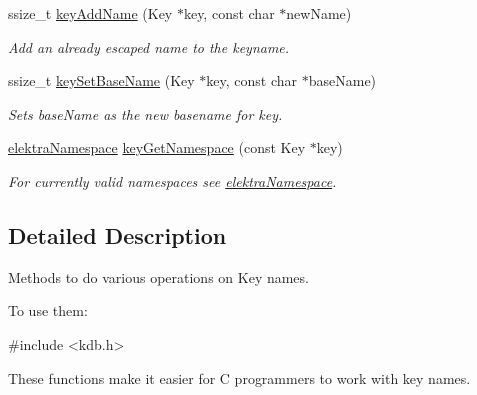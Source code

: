 \begin{DoxyCompactItemize}
ssize\+\_\+t \hyperlink{group__keyname_gaa70593a2c772c4b7bc33423b9b10a270}{key\+Add\+Name} (Key $\ast$key, const char $\ast$new\+Name)
\begin{DoxyCompactList}\small\item\em Add an already escaped name to the keyname. \end{DoxyCompactList}\item 
ssize\+\_\+t \hyperlink{group__keyname_ga6e804bd453f98c28b0ff51430d1df407}{key\+Set\+Base\+Name} (Key $\ast$key, const char $\ast$base\+Name)
\begin{DoxyCompactList}\small\item\em Sets {\ttfamily base\+Name} as the new basename for {\ttfamily key}. \end{DoxyCompactList}\item 
\hyperlink{group__key_gaec3b8d6f430ae49b91bafe8a86310a68}{elektra\+Namespace} \hyperlink{group__keyname_gafc3ca03ed10f87eb59bdc02cf2a0de8d}{key\+Get\+Namespace} (const Key $\ast$key)
\begin{DoxyCompactList}\small\item\em For currently valid namespaces see \hyperlink{group__key_gaec3b8d6f430ae49b91bafe8a86310a68}{elektra\+Namespace}. \end{DoxyCompactList}\end{DoxyCompactItemize}


\subsection{Detailed Description}
Methods to do various operations on Key names. 

To use them\+: 
\begin{DoxyCode}
\textcolor{preprocessor}{#include <kdb.h>}
\end{DoxyCode}


These functions make it easier for C programmers to work with key names.


